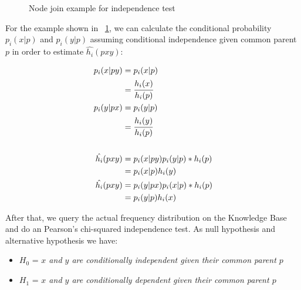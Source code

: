 \begin{figure}[h!]
  \label{fig:joinIndepExample}
  \caption{Node join example for independence test}
  \centering
\end{figure}



For the example shown in ~\ref{fig:joinIndepExample}, we can calculate the conditional probability $p_i(x|p)$ and $p_i(y|p)$ assuming conditional independence given common parent $p$ in order to estimate $\hat{h_i}(p x y)$:

\begin{equation}
\begin{split}
 p_i(x|py) &= p_i(x|p) \\ 
 &= \cfrac{h_i(x)}{h_i(p)} \\ 
 p_i(y|px) &= p_i(y|p) \\ 
 &= \cfrac{h_i(y)}{h_i(p)} \\ \\ 
 \hat{h_i}(pxy) &= p_i(x|py)p_i(y|p)*h_i(p) \\ 
 &= p_i(x|p)h_i(y) \\ 
 \hat{h_i}(pxy) &= p_i(y|px)p_i(x|p)*h_i(p) \\ 
 &= p_i(y|p)h_i(x) 
\end{split}
\end{equation}

After that, we query the actual frequency distribution on the Knowledge Base and do an Pearson's chi-squared independence test. As null hypothesis and alternative hypothesis we have:

\begin{itemize}
 \item $H_0$ = \emph{$x$ and $y$ are conditionally independent given their common parent $p$}
 \item $H_1$ = \emph{$x$ and $y$ are conditionally dependent given their common parent $p$} 
\end{itemize}

